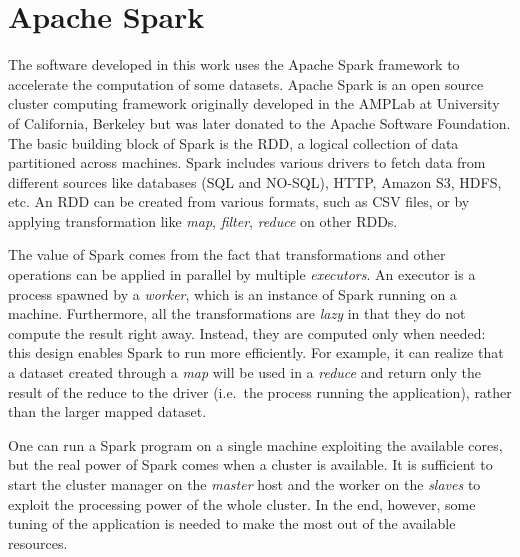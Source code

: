 \section{Apache Spark}
The software developed in this work uses the Apache Spark framework to accelerate the computation of some datasets.
Apache Spark is an open source cluster computing framework originally developed in the AMPLab at University of California, Berkeley but was later donated to the Apache Software Foundation.
The basic building block of Spark is the \ac{RDD}, a logical collection of data partitioned across machines.
Spark includes various drivers to fetch data from different sources like databases (SQL and NO-SQL), HTTP, Amazon S3, HDFS, etc.
An \acs{RDD} can be created from various formats, such as \ac{CSV} files, or by applying transformation like \emph{map}, \emph{filter}, \emph{reduce} on other \acp{RDD}.

The value of Spark comes from the fact that transformations and other operations can be applied in parallel by multiple \emph{executors}.
An executor is a process spawned by a \emph{worker}, which is an instance of Spark running on a machine.
Furthermore, all the transformations are \emph{lazy} in that they do not compute the result right away.
Instead, they are computed only when needed: this design enables Spark to run more efficiently.
For example, it can realize that a dataset created through a \emph{map} will be used in a \emph{reduce} and return only the result of the reduce to the driver (i.e.\ the process running the application), rather than the larger mapped dataset.

One can run a Spark program on a single machine exploiting the available cores, but the real power of Spark comes when a cluster is available.
It is sufficient to start the cluster manager on the \emph{master} host and the worker on the \emph{slaves} to exploit the processing power of the whole cluster.
In the end, however, some tuning of the application is needed to make the most out of the available resources.
